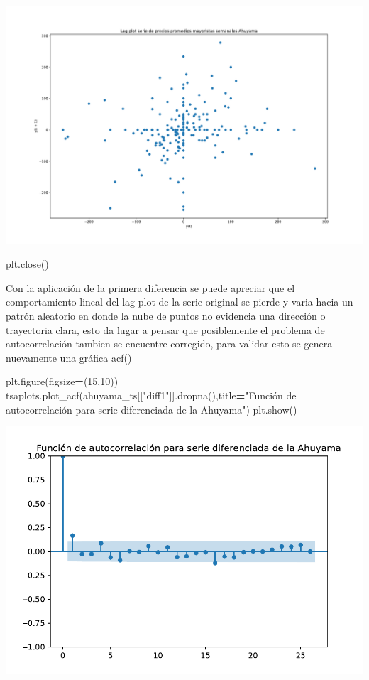 \documentclass[
]{book}
\newenvironment{Shaded}{\begin{snugshade}}{\end{snugshade}}
\newcommand{\DecValTok}[1]{\textcolor[rgb]{0.00,0.00,0.81}{#1}}
\newcommand{\NormalTok}[1]{#1}
\newcommand{\OperatorTok}[1]{\textcolor[rgb]{0.81,0.36,0.00}{\textbf{#1}}}
\newcommand{\StringTok}[1]{\textcolor[rgb]{0.31,0.60,0.02}{#1}}
\begin{document}
\includegraphics{bookdown-demo_files/figure-latex/unnamed-chunk-51-11.pdf}

\begin{Shaded}
\begin{Highlighting}[]
\NormalTok{plt.close()}
\end{Highlighting}
\end{Shaded}

Con la aplicación de la primera diferencia se puede apreciar que el comportamiento lineal del lag plot de la serie original se pierde y varia hacia un patrón aleatorio en donde la nube de puntos no evidencia una dirección o trayectoria clara, esto da lugar a pensar que posiblemente el problema de autocorrelación tambien se encuentre corregido, para validar esto se genera nuevamente una gráfica acf()

\begin{Shaded}
\begin{Highlighting}[]

\NormalTok{plt.figure(figsize}\OperatorTok{=}\NormalTok{(}\DecValTok{15}\NormalTok{,}\DecValTok{10}\NormalTok{))}
\NormalTok{tsaplots.plot\_acf(ahuyama\_ts[[}\StringTok{"diff1"}\NormalTok{]].dropna(),title}\OperatorTok{=}\StringTok{"Función de autocorrelación para serie diferenciada de la Ahuyama"}\NormalTok{)}
\NormalTok{plt.show()}
\end{Highlighting}
\end{Shaded}

\includegraphics{bookdown-demo_files/figure-latex/unnamed-chunk-52-13.pdf}
\end{document}
